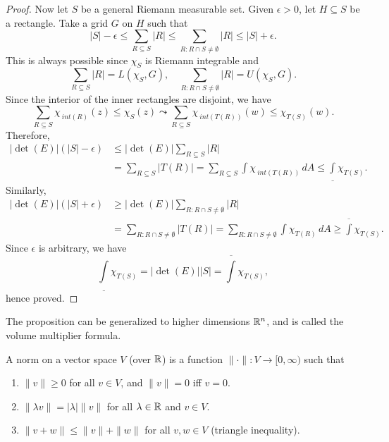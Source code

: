 \begin{prop}
\begin{proof}
        Now let $S$ be a general Riemann measurable set. Given $\epsilon > 0$, let $H \subseteq S$ be a rectangle. Take a grid $G$ on $H$ such that
        \[
        |S| - \epsilon \leq \sum_{R \subseteq S} |R| \leq \sum_{R: R\cap S \neq \emptyset} |R| \leq |S| + \epsilon.
        \]
        This is always possible since $\chi_S$ is Riemann integrable and
        \[
        \sum_{R \subseteq S} |R| = L(\chi_S, G), \quad \sum_{R: R\cap S \neq \emptyset} |R| = U(\chi_S, G).
        \]
        Since the interior of the inner rectangles are disjoint, we have
        \[
        \sum_{R \subseteq S} \chi_{~int (R)}(z) \leq \chi_S(z) \leadsto \sum_{R \subseteq S} \chi_{~int (T(R))}(w) \leq \chi_{T(S)}(w).
        \]
        Therefore,
        \begin{align*}
            |\det (E)|(|S| - \epsilon) &\leq |\det (E)| \sum_{R \subseteq S} |R| \\
            &= \sum_{R \subseteq S} |T(R)| = \sum_{R \subseteq S} \int \chi_{~int (T(R))} \, dA \leq \underline{\int} \chi_{T(S)}.
        \end{align*}
        Similarly,
        \begin{align*}
            |\det (E)|(|S| + \epsilon) &\geq |\det (E)| \sum_{R: R\cap S \neq \emptyset} |R| \\
            &= \sum_{R: R\cap S \neq \emptyset} |T(R)| = \sum_{R: R\cap S \neq \emptyset} \int \chi_{T(R)} \, dA \geq \overline{\int} \chi_{T(S)}.
        \end{align*}
        Since $\epsilon$ is arbitrary, we have
        \[
        \underline{\int} \chi_{T(S)} = |\det (E)| |S| = \overline{\int} \chi_{T(S)},
        \]
        hence proved.
    \end{proof}
\end{prop}

\begin{rmk}
    The proposition can be generalized to higher dimensions ${\mathbb R}^n$, and is called the volume multiplier formula.
\end{rmk}

\begin{df}
    A norm on a vector space $V$ (over ${\mathbb R}$) is a function $\|\cdot\|: V \to [0, \infty)$ such that
    \begin{enumerate}
        \item $\|v\| \geq 0$ for all $v \in V$, and $\|v\| = 0$ iff $v = 0$.
        \item $\|\lambda v\| = |\lambda| \|v\|$ for all $\lambda \in {\mathbb R}$ and $v \in V$.
        \item $\|v + w\| \leq \|v\| + \|w\|$ for all $v, w \in V$ (triangle inequality).
    \end{enumerate}
\end{df}


